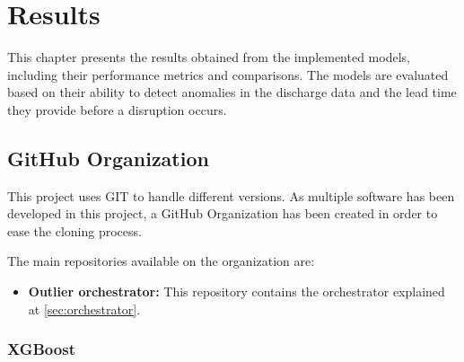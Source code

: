 \chapter{Results}\label{sec:cap4}

This chapter presents the results obtained from the implemented models, including their performance metrics and comparisons. The models are evaluated based on their ability to detect anomalies in the discharge data and the lead time they provide before a disruption occurs.

\section{GitHub Organization}

This project uses  GIT to handle different versions. As multiple software has been developed in this project, a GitHub Organization has been created in order to ease the cloning process.

The main repositories available on the organization are:

\begin{itemize}
    \item \textbf{Outlier orchestrator:} This repository contains the orchestrator explained at \autoref{sec:orchestrator}. 
\end{itemize}


\subsection{XGBoost}